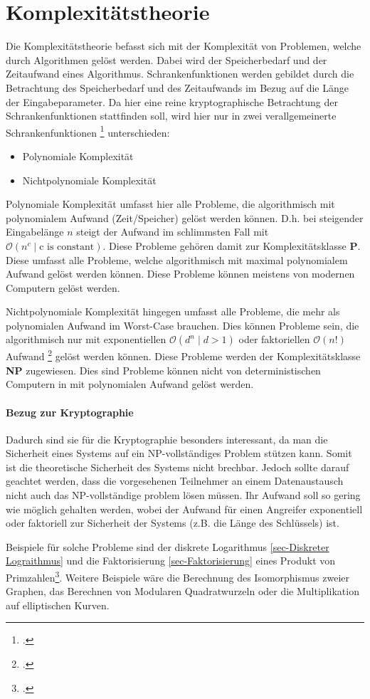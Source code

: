 \section{Komplexitätstheorie}
    Die Komplexitätstheorie befasst sich mit der Komplexität von Problemen, welche durch Algorithmen gelöst werden. Dabei wird der Speicherbedarf und der Zeitaufwand eines Algorithmus. Schrankenfunktionen werden gebildet durch die Betrachtung des Speicherbedarf und des Zeitaufwands im Bezug auf die Länge der Eingabeparameter. Da hier eine reine kryptographische Betrachtung der Schrankenfunktionen stattfinden soll, wird hier nur in zwei verallgemeinerte Schrankenfunktionen \footcite[178]{BSW.2015} unterschieden:
    \begin{itemize}
        \item Polynomiale Komplexität
        \item Nichtpolynomiale Komplexität
    \end{itemize}
    Polynomiale Komplexität umfasst hier alle Probleme, die algorithmisch mit polynomialem Aufwand (Zeit/Speicher) gelöst werden können. D.h. bei steigender Eingabelänge $n$ steigt der Aufwand im schlimmsten Fall mit $\mathcal{O}(n^{c} \mid \text{c is constant})$.
    Diese Probleme gehören damit zur Komplexitätsklasse \textbf{P}. Diese umfasst alle Probleme, welche algorithmisch mit maximal polynomialem Aufwand gelöst werden können. Diese Probleme können meistens von modernen Computern gelöst werden.

    Nichtpolynomiale Komplexität hingegen umfasst alle Probleme, die mehr als polynomialen Aufwand im Worst-Case brauchen. Dies können Probleme sein, die algorithmisch nur mit exponentiellen $\mathcal{O}(d^{n} \mid d > 1)$ oder faktoriellen $\mathcal{O}(n!)$ Aufwand \footcite{wiki.komplex} gelöst werden können. 
    Diese Probleme werden der Komplexitätsklasse \textbf{NP} zugewiesen. Dies sind Probleme können nicht von deterministischen Computern in mit polynomialen Aufwand gelöst werden. 
    
    \paragraph{Bezug zur Kryptographie} Dadurch sind sie für die Kryptographie besonders interessant, da man die Sicherheit eines Systems auf ein NP-vollständiges Problem stützen kann. Somit ist die theoretische Sicherheit des Systems nicht brechbar. Jedoch sollte darauf geachtet werden, dass die vorgesehenen Teilnehmer an einem Datenaustausch nicht auch das NP-vollständige problem lösen müssen. Ihr Aufwand soll so gering wie möglich gehalten werden, wobei der Aufwand für einen Angreifer exponentiell oder faktoriell zur Sicherheit der Systems (z.B. die Länge des Schlüssels) ist. 

    Beispiele für solche Probleme sind der diskrete Logarithmus \ref{sec-Diskreter Lograithmus} und die Faktorisierung \ref{sec-Faktorisierung} eines Produkt von Primzahlen\footcite[179]{BSW.2015}. Weitere Beispiele wäre die Berechnung des Isomorphismus zweier Graphen, das Berechnen von Modularen Quadratwurzeln oder die Multiplikation auf elliptischen Kurven.

